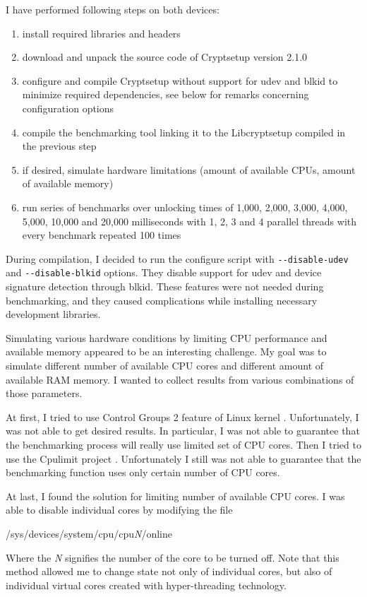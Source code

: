 \documentclass[nolof,digital]{fithesis3}
\begin{document}
I have performed following steps on both devices:

\begin{enumerate}
\item install required libraries and headers

\item download and unpack the source code of Cryptsetup version 2.1.0

\item configure and compile Cryptsetup without support for udev and blkid to minimize required dependencies, see below for remarks concerning configuration options

\item compile the benchmarking tool linking it to the Libcryptsetup compiled in the previous step

\item if desired, simulate hardware limitations (amount of available CPUs, amount of available memory)

\item run series of benchmarks over unlocking times of 1,000, 2,000, 3,000, 4,000, 5,000, 10,000 and 20,000 milliseconds with 1, 2, 3 and 4 parallel threads with every benchmark repeated 100 times
\end{enumerate}

During compilation, I decided to run the configure script with \verb+--disable-udev+ and \verb+--disable-blkid+ options. They disable support for udev and device signature detection through blkid. These features were not needed during benchmarking, and they caused complications while installing necessary development libraries.

Simulating various hardware conditions by limiting CPU performance and available memory appeared to be an interesting challenge. My goal was to simulate different number of available CPU cores and different amount of available RAM memory. I wanted to collect results from various combinations of those parameters.

At first, I tried to use Control Groups 2 feature of Linux kernel \parencite{cgroups2}. Unfortunately, I was not able to get desired results. In particular, I was not able to guarantee that the benchmarking process will really use limited set of CPU cores. Then I tried to use the Cpulimit project \parencite{cpulimit}. Unfortunately I still was not able to guarantee that the benchmarking function uses only certain number of CPU cores.

At last, I found the solution for limiting number of available CPU cores. I was able to disable individual cores by modifying the file 
\begin{tt}
/sys/devices/system/cpu/cpu\emph{N}/online
\end{tt}
 Where the \emph{N} signifies the number of the core to be turned off. Note that this method allowed me to change state not only of individual cores, but also of individual virtual cores created with hyper-threading technology.
\end{document}
